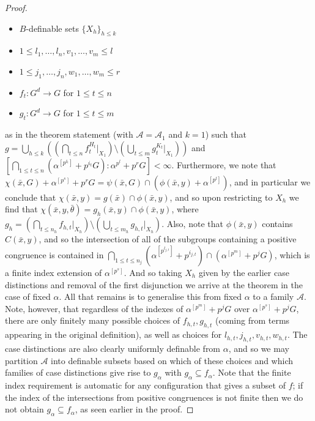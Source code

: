 \documentclass[a4paper,11pt]{article}
\newcommand{\acl}{\textrm{acl}}
\newcommand{\nl}{\newline}
\begin{document}
\begin{proof}
	\begin{itemize}
		\item $B$-definable sets $\{X_h\}_{h\leq k}$
		\item $1\leq l_{1},\dots,l_{n},v_{1},\dots,v_{m}\leq l$
		\item $1\leq j_{1},\dots,j_{n},w_{1},\dots,w_{m}\leq r$
		\item $f_{t}:G^d\rightarrow G$ for $1\leq t\leq n$
		\item $g_{t}:G^d\rightarrow G$ for $1\leq t\leq m$
	\end{itemize}
	as in the theorem statement (with $\mathcal{A} = \mathcal{A}_1$ and $k=1$) such that $g = \bigcup\limits_{h\leq k} ((\bigcap\limits_{t\leq n}f^{H_{t}}_{t}|_{X_1})\setminus(\bigcup\limits_{t\leq m}g^{K_{t}}_{t}|_{X_1}))$ and $\left[\bigcap\limits_{1\leq t\leq n}(\alpha^{[p^{l_{t}}]}+p^{i_{t}}G):\alpha^{p^l}+p^rG\right]<\infty$.
	\nl\nl
	Furthermore, we note that $\chi(\bar x, G) + \alpha^{[p^s]}+p^rG = \psi(\bar x, G)\cap (\phi(\bar x, y) + \alpha^{[p^l]})$, and in particular we conclude that $\chi(\bar x, y) = g(\bar x)\cap\phi(\bar x, y)$, and so upon restricting to $X_h$ we find that $\chi(\bar x, y, \bar\theta) = g_h(\bar x, y)\cap\phi(\bar x, y)$, where $g_h = (\bigcap\limits_{t\leq n_h}f_{h,t}|_{X_h})\setminus(\bigcup\limits_{t\leq m_h}g_{h,t}|_{X_h})$.
    \nl\nl
	Also, note that $\phi(\bar x, y)$ contains $C(\bar x, y)$, and so the intersection of all of the subgroups containing a positive congruence is contained in $\bigcap\limits_{1\leq t\leq n_j}(
    \alpha^{[p^{l_{j,t}}]}+p^{i_{j,t}})\cap (\alpha^{[p^m]}+p^jG)$, which is a finite index extension of $\alpha^{[p^s]}$. And so taking $X_h$ given by the earlier case distinctions and removal of the first disjunction we arrive at the theorem in the case of fixed $\alpha$.
    \nl\nl
    All that remains is to generalise this from fixed $\alpha$ to a family $\mathcal{A}$. Note, however, that regardless of the indexes of $\alpha^{[p^m]}+p^jG$ over $\alpha^{[p^s]}+p^jG$, there are only finitely many possible choices of $f_{h,t},g_{h,t}$ (coming from terms appearing in the original definition), as well as choices for $l_{h,t},j_{h,t},v_{h,t},w_{h,t}$. The case distinctions are also clearly uniformly definable from $\alpha$, and so we may partition $\mathcal{A}$ into definable subsets based on which of these choices and which families of case distinctions give rise to $g_\alpha$ with $g_\alpha \subseteq f_\alpha$. Note that the finite index requirement is automatic for any configuration that gives a subset of $f$; if the index of the intersections from positive congruences is not finite then we do not obtain $g_\alpha\subseteq f_\alpha$, as seen earlier in the proof.
	

\end{proof}
\end{document}
